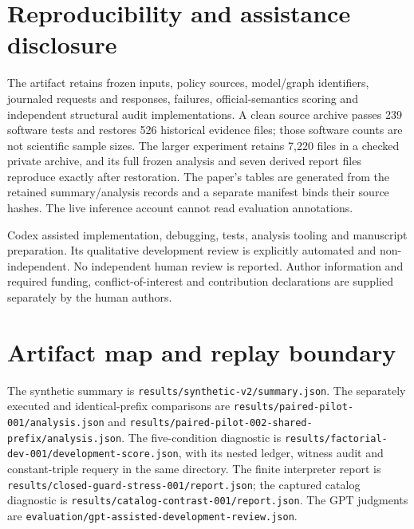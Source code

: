 \documentclass[10pt]{article}
\begin{document}
\section*{Reproducibility and assistance disclosure}

The artifact retains frozen inputs, policy sources, model/graph identifiers, journaled requests and responses, failures, official-semantics scoring and independent structural audit implementations. A clean source archive passes 239 software tests and restores 526 historical evidence files; those software counts are not scientific sample sizes. The larger experiment retains 7,220 files in a checked private archive, and its full frozen analysis and seven derived report files reproduce exactly after restoration. The paper's tables are generated from the retained summary/analysis records and a separate manifest binds their source hashes. The live inference account cannot read evaluation annotations.\par

Codex assisted implementation, debugging, tests, analysis tooling and manuscript preparation. Its qualitative development review is explicitly automated and non-independent. No independent human review is reported. Author information and required funding, conflict-of-interest and contribution declarations are supplied separately by the human authors.\par

\appendix

\section{Artifact map and replay boundary}

The synthetic summary is \texttt{results/synthetic-v2/summary.json}. The separately executed and identical-prefix comparisons are \texttt{results/paired-pilot-001/analysis.json} and \texttt{results/paired-pilot-002-shared-prefix/analysis.json}. The five-condition diagnostic is \texttt{results/factorial-dev-001/development-score.json}, with its nested ledger, witness audit and constant-triple requery in the same directory. The finite interpreter report is \texttt{results/closed-guard-stress-001/report.json}; the captured catalog diagnostic is \texttt{results/catalog-contrast-001/report.json}. The GPT judgments are \texttt{evaluation/gpt-assisted-development-review.json}.\par
\end{document}
